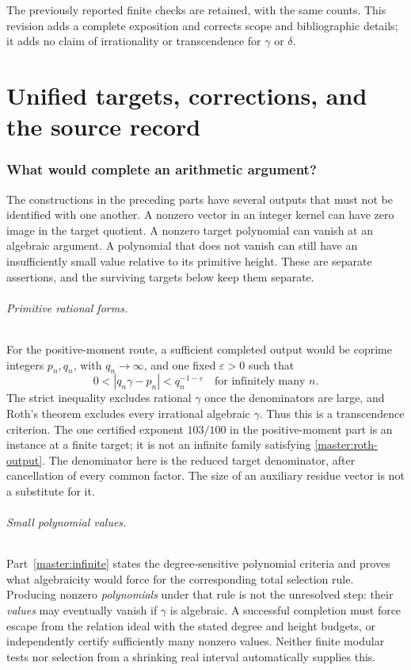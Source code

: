 \documentclass[11pt,a4paper]{article}
\theoremstyle{definition}
\theoremstyle{remark}
\numberwithin{equation}{section}
\begin{document}
The previously reported finite checks are retained, with the same
counts. This revision adds a complete exposition and corrects scope
and bibliographic details; it adds no claim of irrationality or
transcendence for $\gamma$ or $\delta$.


\clearpage
\part{Unified targets, corrections, and the source record}
\label{master:closing}
\section{What would complete an arithmetic argument?}
\label{master:remaining}

The constructions in the preceding parts have several outputs that must
not be identified with one another. A nonzero vector in an integer kernel
can have zero image in the target quotient. A nonzero target polynomial
can vanish at an algebraic argument. A polynomial that does not vanish can
still have an insufficiently small value relative to its primitive height.
These are separate assertions, and the surviving targets below keep them
separate.

\paragraph{Primitive rational forms.}
For the positive-moment route, a sufficient completed output would be
coprime integers $p_n,q_n$, with $q_n\to\infty$, and one fixed
$\varepsilon>0$ such that
\begin{equation}\label{master:roth-output}
 0<|q_n\gamma-p_n|<q_n^{-1-\varepsilon}
 \quad\text{for infinitely many }n.
\end{equation}
The strict inequality excludes rational $\gamma$ once the denominators are
large, and Roth's theorem excludes every irrational algebraic $\gamma$.
Thus this is a transcendence criterion. The one certified exponent
$103/100$ in the positive-moment part is an instance at a finite target;
it is not an infinite family satisfying \eqref{master:roth-output}.
The denominator here is the reduced target denominator, after cancellation
of every common factor. The size of an auxiliary residue vector is not a
substitute for it.

\paragraph{Small polynomial values.}
Part~\ref{master:infinite} states the degree-sensitive polynomial criteria
and proves what algebraicity would force for the corresponding total
selection rule. Producing nonzero \emph{polynomials} under that rule is not
the unresolved step: their \emph{values} may eventually vanish if
$\gamma$ is algebraic. A successful completion must force escape from the
relation ideal with the stated degree and height budgets, or independently
certify sufficiently many nonzero values. Neither finite modular tests nor
selection from a shrinking real interval automatically supplies this.
\end{document}
